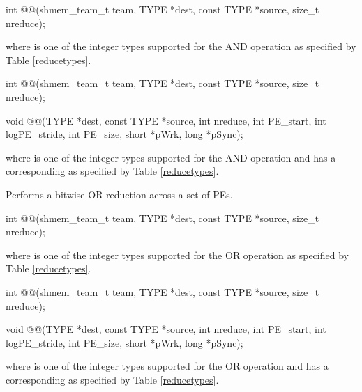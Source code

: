 \begin{apidefinition}
\begin{C11synopsis}
int @@(shmem_team_t team, TYPE *dest, const TYPE *source, size_t nreduce);
\end{C11synopsis}
where \TYPE{} is one of the integer types supported for the AND operation as specified by Table \ref{reducetypes}.

\begin{Csynopsis}
\end{Csynopsis}
\begin{CsynopsisCol}
int @@(shmem_team_t team, TYPE *dest, const TYPE *source, size_t nreduce);
\end{CsynopsisCol}

\begin{DeprecateBlock}
\begin{CsynopsisCol}
void @@(TYPE *dest, const TYPE *source, int nreduce, int PE_start, int logPE_stride, int PE_size, short *pWrk, long *pSync);
\end{CsynopsisCol}
\end{DeprecateBlock}
where \TYPE{} is one of the integer types supported for the AND operation and has a corresponding \TYPENAME{} as specified by Table \ref{reducetypes}.

Performs a bitwise OR reduction across a set of \acp{PE}.\newline

\begin{C11synopsis}
int @@(shmem_team_t team, TYPE *dest, const TYPE *source, size_t nreduce);
\end{C11synopsis}
where \TYPE{} is one of the integer types supported for the OR operation as specified by Table \ref{reducetypes}.

\begin{Csynopsis}
\end{Csynopsis}
\begin{CsynopsisCol}
int @@(shmem_team_t team, TYPE *dest, const TYPE *source, size_t nreduce);
\end{CsynopsisCol}

\begin{DeprecateBlock}
\begin{CsynopsisCol}
void @@(TYPE *dest, const TYPE *source, int nreduce, int PE_start, int logPE_stride, int PE_size, short *pWrk, long *pSync);
\end{CsynopsisCol}
\end{DeprecateBlock}
where \TYPE{} is one of the integer types supported for the OR operation and has a corresponding \TYPENAME{} as specified by Table \ref{reducetypes}.


\end{apidefinition}
